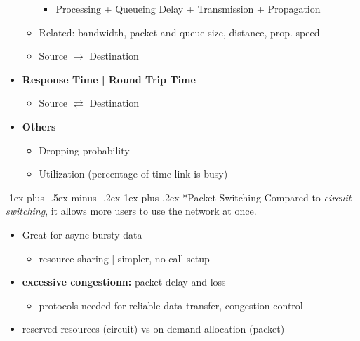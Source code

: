 \documentclass[10pt,landscape]{article}
\makeatletter
\renewcommand{\subsubsection}{\@startsection{subsubsection}{3}{0mm}%
                                {-1ex plus -.5ex minus -.2ex}%
                                {1ex plus .2ex}%
                                {\normalfont\small\bfseries}}
\makeatother
\begin{document}
\begin{multicols*}{3}
\begin{itemize}[topsep=0pt,noitemsep,wide=0pt, leftmargin=\dimexpr{} + 2\relax]
\begin{itemize}[topsep=0pt,noitemsep,wide=0pt, leftmargin=\dimexpr{} + 2\relax]
        \begin{itemize}[topsep=0pt,noitemsep,wide=0pt, leftmargin=\dimexpr{} + 2\relax]
            \item Processing + Queueing Delay + Transmission + Propagation
        \end{itemize}
        \item Related: bandwidth, packet and queue size, distance, prop. speed
        \item Source $\rightarrow$ Destination
    \end{itemize}
    \item \textbf{Response Time | Round Trip Time}
    \begin{itemize}[topsep=0pt,noitemsep,wide=0pt, leftmargin=\dimexpr{} + 2\relax]
      \item Source $\rightleftarrows$ Destination
    \end{itemize}
    \item \textbf{Others}
    \begin{itemize}[topsep=0pt,noitemsep,wide=0pt, leftmargin=\dimexpr{} + 2\relax]
      \item Dropping probability
      \item Utilization (percentage of time link is busy)
    \end{itemize}
\end{itemize}

\subsubsection*{Packet Switching}
Compared to \textit{circuit-switching}, it allows more users to use the network at once.
\begin{itemize}[topsep=0pt,noitemsep,wide=0pt, leftmargin=\dimexpr{} + 2\relax]
  \item Great for async bursty data
  \begin{itemize}[topsep=0pt,noitemsep,wide=0pt, leftmargin=\dimexpr{} + 2\relax]
    \item resource sharing | simpler, no call setup
  \end{itemize}
  \item \textbf{excessive congestionn:} packet delay and loss
  \begin{itemize}[topsep=0pt,noitemsep,wide=0pt, leftmargin=\dimexpr{} + 2\relax]
    \item protocols needed for reliable data transfer, congestion control
  \end{itemize}
  \item reserved resources (circuit) vs on-demand allocation (packet)
\end{itemize}


\end{multicols*}
\end{document}
